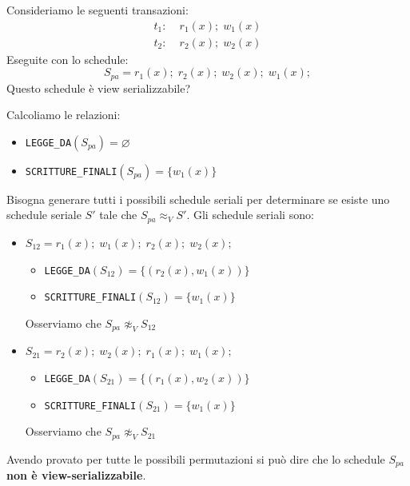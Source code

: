 \documentclass[a4paper,twoside]{article}
\begin{document}
\begin{exercise}
  Consideriamo le seguenti transazioni:
  \[
  \begin{aligned}
    t_1:\; & r_1(x); \; w_1(x) \\
    t_2:\; & r_2(x); \; w_2(x)
  \end{aligned}
  \] 
  Eseguite con lo schedule:
  \[
    S_{pa} = r_1(x); \; r_2(x); \; w_2(x); \; w_1(x);
  \] 
  Questo schedule è view serializzabile?

  \vspace{1em}
  \noindent
  Calcoliamo le relazioni:
  \begin{itemize}
    \item \texttt{LEGGE\_DA}\( (S_{pa}) = \varnothing \)
    \item \texttt{SCRITTURE\_FINALI}\( (S_{pa}) = \{ w_1(x) \} \)
  \end{itemize}
  
  \vspace{1em}
  \noindent
  Bisogna generare tutti i possibili schedule seriali per determinare se
  esiste uno schedule seriale \( S' \) tale che \( S_{pa} \approx_V S' \).
  Gli schedule seriali sono:
  \begin{itemize}
    \item \( S_{12} = r_1(x); \; w_1(x); \; r_2(x); \; w_2(x); \) 
      \begin{itemize}
        \item \texttt{LEGGE\_DA}\( (S_{12}) = \{ (r_2(x), w_1(x)) \} \)
        \item \texttt{SCRITTURE\_FINALI}\( (S_{12}) = \{ w_1(x) \} \)
      \end{itemize}
      Osserviamo che \( S_{pa} \not\approx_V S_{12} \)

    \item \( S_{21} = r_2(x); \; w_2(x); \; r_1(x); \; w_1(x); \) 
      \begin{itemize}
        \item \texttt{LEGGE\_DA}\( (S_{21}) = \{ (r_1(x), w_2(x)) \} \)
        \item \texttt{SCRITTURE\_FINALI}\( (S_{21}) = \{ w_1(x) \} \)
      \end{itemize}
      Osserviamo che \( S_{pa} \not\approx_V S_{21} \)
  \end{itemize}
  Avendo provato per tutte le possibili permutazioni si può dire che lo schedule
  \( S_{pa} \) \textbf{non è view-serializzabile}.
\end{exercise}
\end{document}
